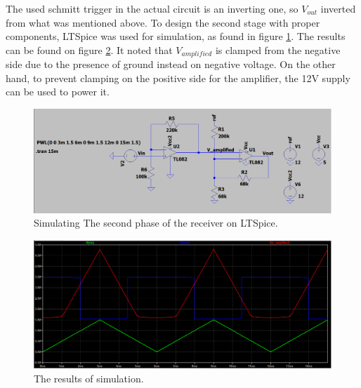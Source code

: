 The used schmitt trigger in the actual circuit is an inverting one, so $V_{out}$ inverted from what was mentioned above. To design the second stage with proper components, LTSpice was used for simulation, as found in figure \ref{fig:hw-amp-schmitt-sim}. The results can be found on figure \ref{fig:hw-amp-schmitt-results}. It noted that $V_{amplified}$ is clamped from the negative side due to the presence of ground instead on negative voltage. On the other hand, to prevent clamping on the positive side for the amplifier, the 12V supply can be used to power it.

\begin{figure}[h!]
	\centering
	\includegraphics[scale=0.35]{Figures/HW/amp-schmitt-ltspice.png}
	\caption{Simulating The second phase of the receiver on LTSpice.}
	\label{fig:hw-amp-schmitt-sim}
\end{figure}

\begin{figure}[h!]
	\centering
	\includegraphics[scale=0.35]{Figures/HW/amp-schmitt-ltspice-results.png}
	\caption{The results of simulation.}
	\label{fig:hw-amp-schmitt-results}
\end{figure}





